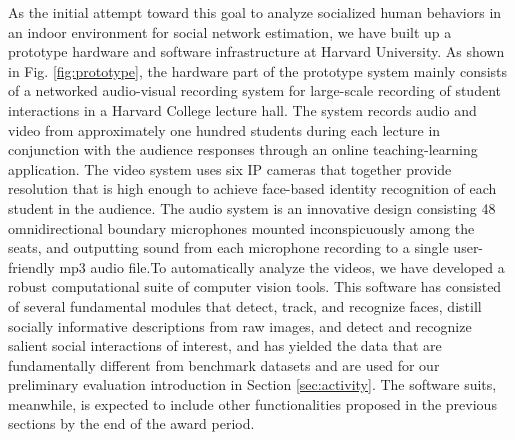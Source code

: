 As the initial attempt toward this goal to analyze socialized human behaviors in an indoor environment for social network estimation, we have built up a prototype hardware and software infrastructure at Harvard University. As shown in Fig. \ref{fig:prototype}, the hardware part of the prototype system mainly consists of a networked audio-visual recording system for large-scale recording of student interactions in a Harvard College lecture hall. The system records audio and video from approximately one hundred students during each lecture in conjunction with the audience responses through an online teaching-learning application. The video system uses six IP cameras that together provide resolution that is high enough to achieve face-based identity recognition of each student in the audience. The audio system is an innovative design consisting 48 omnidirectional boundary microphones mounted inconspicuously among the seats, and outputting sound from each microphone recording to a single user-friendly mp3 audio file.To automatically analyze the videos, we have developed a robust computational suite of computer vision tools. This software has consisted of several fundamental modules that detect, track, and recognize faces,  distill socially informative descriptions from raw images, and detect and recognize salient social interactions of interest, and has yielded the data that are fundamentally different from benchmark datasets \cite{UTdata,Choi:context,Choi:recogtrack} and are used for our preliminary evaluation introduction in Section \ref{sec:activity}. The software suits, meanwhile, is expected to include other functionalities proposed in the previous sections by the end of the award period.

